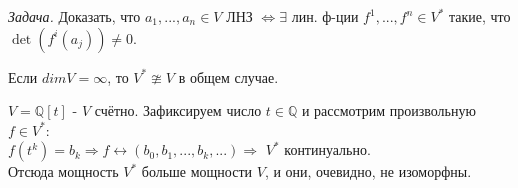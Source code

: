     \textit{Задача.} Доказать, что $a_1,...,a_n\in V$ ЛНЗ $\Leftrightarrow \exists$ лин. ф-ции $f^1,...,f^n\in V^{*}$ такие, что $\det(f^i(a_j)) \neq 0$.
    \begin{remark}
        Если $dim V = \infty$, то $V^{*} \ncong V$ в общем случае.
    \end{remark}
    \begin{example1}
        $V = \mathbb{Q}[t]$ - $V$ счётно. Зафиксируем число $t\in \mathbb{Q}$ и рассмотрим произвольную $f \in V^{*}$:\\ 
        $f(t^k) = b_k \Rightarrow f \leftrightarrow (b_0, b_1,..., b_k,...) \Rightarrow$ $V^{*}$ континуально.\\
        Отсюда мощность $V^{*}$ больше мощности $V$, и они, очевидно, не изоморфны.
    \end{example1}